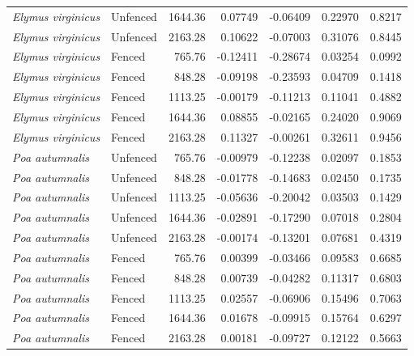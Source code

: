 \documentclass[12pt]{article}\usepackage[]{graphicx}\usepackage[dvipsnames]{xcolor}
\begin{document}
\begin{landscape}
\begin{table}[ht]
\begin{tabular}{llrrrrr}
\textit{Elymus virginicus} & Unfenced & 1644.36 & 0.07749  & -0.06409 & 0.22970  & 0.8217 \\
\textit{Elymus virginicus} & Unfenced & 2163.28 & 0.10622  & -0.07003 & 0.31076  & 0.8445 \\
\textit{Elymus virginicus} & Fenced   & 765.76  & -0.12411 & -0.28674 & 0.03254  & 0.0992 \\
\textit{Elymus virginicus} & Fenced   & 848.28  & -0.09198 & -0.23593 & 0.04709  & 0.1418 \\
\textit{Elymus virginicus} & Fenced   & 1113.25 & -0.00179 & -0.11213 & 0.11041  & 0.4882 \\
\textit{Elymus virginicus} & Fenced   & 1644.36 & 0.08855  & -0.02165 & 0.24020  & 0.9069 \\
\textit{Elymus virginicus} & Fenced   & 2163.28 & 0.11327  & -0.00261 & 0.32611  & 0.9456 \\
\textit{Poa autumnalis}    & Unfenced & 765.76  & -0.00979 & -0.12238 & 0.02097  & 0.1853 \\
\textit{Poa autumnalis}    & Unfenced & 848.28  & -0.01778 & -0.14683 & 0.02450  & 0.1735 \\
\textit{Poa autumnalis}    & Unfenced & 1113.25 & -0.05636 & -0.20042 & 0.03503  & 0.1429 \\
\textit{Poa autumnalis}    & Unfenced & 1644.36 & -0.02891 & -0.17290 & 0.07018  & 0.2804 \\
\textit{Poa autumnalis}    & Unfenced & 2163.28 & -0.00174 & -0.13201 & 0.07681  & 0.4319 \\
\textit{Poa autumnalis}    & Fenced   & 765.76  & 0.00399  & -0.03466 & 0.09583  & 0.6685 \\
\textit{Poa autumnalis}    & Fenced   & 848.28  & 0.00739  & -0.04282 & 0.11317  & 0.6803 \\
\textit{Poa autumnalis}    & Fenced   & 1113.25 & 0.02557  & -0.06906 & 0.15496  & 0.7063 \\
\textit{Poa autumnalis}    & Fenced   & 1644.36 & 0.01678  & -0.09915 & 0.15764  & 0.6297 \\
\textit{Poa autumnalis}    & Fenced   & 2163.28 & 0.00181  & -0.09727 & 0.12122  & 0.5663 \\
\hline
\end{tabular}
\end{table}
\end{landscape}
\clearpage
\end{document}
